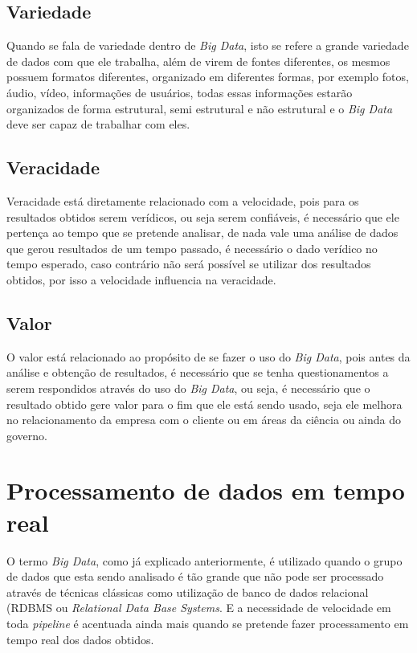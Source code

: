 \subsection{Variedade}
\label{subsec:variedade}
Quando se fala de variedade dentro de \textit{Big Data}, isto se refere a grande variedade de dados com que ele trabalha, além de virem de fontes diferentes, os mesmos possuem formatos diferentes, organizado em diferentes formas, por exemplo fotos, áudio, vídeo, informações de usuários, todas essas informações estarão organizados de forma estrutural, semi estrutural e não estrutural e o \textit{Big Data} deve ser capaz de trabalhar com eles.~\cite{forbes} 

\subsection{Veracidade}
\label{subsec:veracidade}
Veracidade está diretamente relacionado com a velocidade, pois para os resultados obtidos serem verídicos, ou seja serem confiáveis, é necessário que ele pertença ao tempo que se pretende analisar, de nada vale uma análise de dados que gerou resultados de um tempo passado, é necessário o dado verídico no tempo esperado, caso contrário não será possível se utilizar dos resultados obtidos, por isso a velocidade influencia na veracidade.~\cite{forbes} 

\subsection{Valor}
\label{subsec:valor}
O valor está relacionado ao propósito de se fazer o uso do \textit{Big Data}, pois antes da análise e obtenção de resultados, é necessário que se tenha questionamentos a serem respondidos através do uso do \textit{Big Data}, ou seja, é necessário que o resultado obtido gere valor para o fim que ele está sendo usado, seja ele melhora no relacionamento da empresa com o cliente ou em áreas da ciência ou ainda do governo.~\cite{forbes} 

\section{Processamento de dados em tempo real}
O termo \textit{Big Data}, como já explicado anteriormente, é utilizado quando o grupo de dados que esta sendo analisado é tão grande que não pode ser processado através de técnicas clássicas como utilização de banco de dados relacional (RDBMS ou \textit{Relational Data Base Systems}. E a necessidade de velocidade em toda \textit{pipeline} é acentuada ainda mais quando se pretende fazer processamento em tempo real dos dados obtidos.


